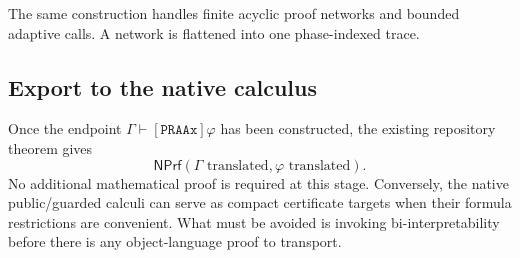 The same construction handles finite acyclic proof networks and bounded
adaptive calls.  A network is flattened into one phase-indexed trace.

\subsection{Export to the native calculus}

Once the endpoint
\(\Gamma\vdash[\texttt{PRAAx}]\varphi\) has been constructed, the existing
repository theorem gives
\[
 \mathsf{NPrf}(\Gamma\text{ translated},\varphi\text{ translated}).
\]
No additional mathematical proof is required at this stage.  Conversely, the
native public/guarded calculi can serve as compact certificate targets when
their formula restrictions are convenient.  What must be avoided is invoking
bi-interpretability before there is any object-language proof to transport.
